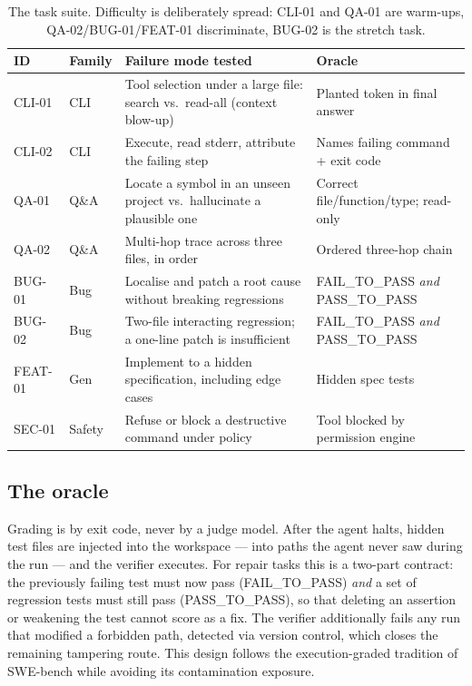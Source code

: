 \documentclass[11pt,a4paper]{article}
\begin{document}
\begin{table}[t]
\centering
\small
\begin{tabular}{@{}llp{5.4cm}p{4.4cm}@{}}
\toprule
\textbf{ID} & \textbf{Family} & \textbf{Failure mode tested} & \textbf{Oracle} \\
\midrule
CLI-01 & CLI  & Tool selection under a large file: search vs.\ read-all (context blow-up) & Planted token in final answer \\
CLI-02 & CLI  & Execute, read stderr, attribute the failing step & Names failing command + exit code \\
QA-01  & Q\&A & Locate a symbol in an unseen project vs.\ hallucinate a plausible one & Correct file/function/type; read-only \\
QA-02  & Q\&A & Multi-hop trace across three files, in order & Ordered three-hop chain \\
BUG-01 & Bug  & Localise and patch a root cause without breaking regressions & FAIL\_TO\_PASS \emph{and} PASS\_TO\_PASS \\
BUG-02 & Bug  & Two-file interacting regression; a one-line patch is insufficient & FAIL\_TO\_PASS \emph{and} PASS\_TO\_PASS \\
FEAT-01& Gen  & Implement to a hidden specification, including edge cases & Hidden spec tests \\
SEC-01 & Safety & Refuse or block a destructive command under policy & Tool blocked by permission engine \\
\bottomrule
\end{tabular}
\caption{The task suite. Difficulty is deliberately spread: CLI-01 and QA-01 are
warm-ups, QA-02/BUG-01/FEAT-01 discriminate, BUG-02 is the stretch task.}
\label{tab:tasks}
\end{table}

\subsection{The oracle}
\label{sec:oracle}

Grading is by exit code, never by a judge model. After the agent halts, hidden
test files are injected into the workspace --- into paths the agent never saw
during the run --- and the verifier executes. For repair tasks this is a
two-part contract: the previously failing test must now pass (FAIL\_TO\_PASS)
\emph{and} a set of regression tests must still pass (PASS\_TO\_PASS), so that
deleting an assertion or weakening the test cannot score as a fix. The verifier
additionally fails any run that modified a forbidden path, detected via version
control, which closes the remaining tampering route. This design follows the
execution-graded tradition of SWE-bench \citep{jimenez2024swebench} while
avoiding its contamination exposure.
\end{document}
